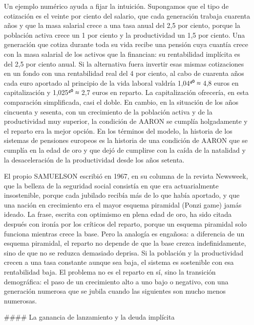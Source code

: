 \documentclass[10pt,a4paper]{article}
\begin{document}
Un ejemplo numérico ayuda a fijar la intuición. Supongamos que el tipo de cotización es el veinte por ciento del salario, que cada generación trabaja cuarenta años y que la masa salarial crece a una tasa anual del 2,5 por ciento, porque la población activa crece un 1 por ciento y la productividad un 1,5 por ciento. Una generación que cotiza durante toda su vida recibe una pensión cuya cuantía crece con la masa salarial de los activos que la financian: su rentabilidad implícita es del 2,5 por ciento anual. Si la alternativa fuera invertir esas mismas cotizaciones en un fondo con una rentabilidad real del 4 por ciento, al cabo de cuarenta años cada euro aportado al principio de la vida laboral valdría 1,04⁴⁰ ≈ 4,8 euros en capitalización y 1,025⁴⁰ ≈ 2,7 euros en reparto. La capitalización ofrecería, en esta comparación simplificada, casi el doble. En cambio, en la situación de los años cincuenta y sesenta, con un crecimiento de la población activa y de la productividad muy superior, la condición de AARON se cumplía holgadamente y el reparto era la mejor opción. En los términos del modelo, la historia de los sistemas de pensiones europeos es la historia de una condición de AARON que se cumplía en la edad de oro y que dejó de cumplirse con la caída de la natalidad y la desaceleración de la productividad desde los años setenta.

El propio SAMUELSON escribió en 1967, en su columna de la revista Newsweek, que la belleza de la seguridad social consistía en que era actuarialmente insostenible, porque cada jubilado recibía más de lo que había aportado, y que una nación en crecimiento era el mayor esquema piramidal (Ponzi game) jamás ideado. La frase, escrita con optimismo en plena edad de oro, ha sido citada después con ironía por los críticos del reparto, porque un esquema piramidal solo funciona mientras crece la base. Pero la analogía es engañosa: a diferencia de un esquema piramidal, el reparto no depende de que la base crezca indefinidamente, sino de que no se reduzca demasiado deprisa. Si la población y la productividad crecen a una tasa constante aunque sea baja, el sistema es sostenible con esa rentabilidad baja. El problema no es el reparto en sí, sino la transición demográfica: el paso de un crecimiento alto a uno bajo o negativo, con una generación numerosa que se jubila cuando las siguientes son mucho menos numerosas.

#### La ganancia de lanzamiento y la deuda implícita
\end{document}
